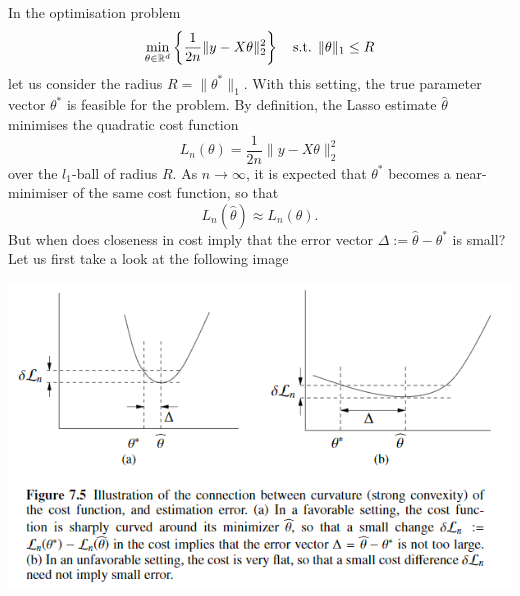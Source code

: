 \documentclass[10pt,handout,english]{beamer}
\newcommand{\R}{\mathbb{R}}
\begin{document}
\begin{frame}[allowframebreaks]
In the optimisation problem
\[
\min_{\theta\in\R^{d}}\left\{ \frac{1}{2n}\lVert y-X\theta\rVert_{2}^{2}\right\} \quad\text{s.t. \ensuremath{\lVert\theta\rVert_{1}\leq R}}
\]
let us consider the radius $R=\lVert\theta^{*}\lVert_{1}$. With this setting, the true parameter vector $\theta^{*}$ is feasible for the problem. By definition, the Lasso estimate $\hat{\theta}$ minimises the quadratic cost function 
\[
L_{n}(\theta)=\frac{1}{2n}\lVert y-X\theta\rVert_{2}^{2}
\]
over the $l_{1}$-ball of radius $R$. As $n\to\infty$, it is expected that $\theta^{*}$ becomes a near-minimiser of the same cost function, so that 
\[
L_{n}(\hat{\theta})\approx L_{n}(\theta).
\]
But when does closeness in cost imply that the error vector $\Delta:=\hat{\theta}-\theta^{*}$ is small? Let us first take a look at the following image
\end{frame}
\begin{frame}
\includegraphics[width=\textwidth]{StrongConvex.png}
\end{frame}
\end{document}
